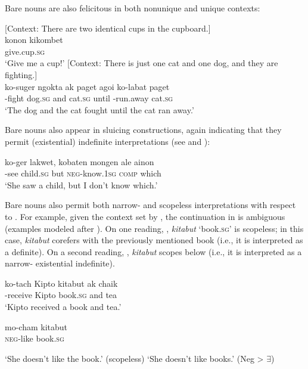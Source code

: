 \documentclass[output=paper]{LSP/langsci}
\begin{document}
\noindent Bare nouns are also felicitous in both nonunique and unique contexts:

\ea \label{ex:landman:uniqueness}
\settowidth{}  
  \ea \label{ex:landman:nonunique} [Context: There are two identical cups in the cupboard.]\\
    \gll konon kikombet \\
         give.\imp cup.\textsc{sg} \\ 
    \glt ‘Give me a cup!’
    \ex \label{ex:landman:unique} [Context: There is just one cat and one dog, and they are fighting.]\\ 
    \gll 
      ko-suger ngokta ak paget agoi ko-labat paget\\
      \pst-fight dog.\textsc{sg} and cat.\textsc{sg} until \pst-run.away cat.\textsc{sg}\\ 
    \glt ‘The dog and the cat fought until the cat ran away.’
  \z
\z 

Bare nouns also appear in sluicing constructions, again indicating that they permit (existential) indefinite interpretations (see \citealt{Chung:1995} and \citealt{Reinhart:1997}):

\ea \label{ex:landman:sluicing}
  \gll ko-ger lakwet, kobaten mongen ale ainon\\	
	   \pst-see child.\textsc{sg} but \textsc{neg}-know.1\textsc{sg} \textsc{comp} which\\
  \glt ‘She saw a child, but I don't know which.’
\z 

Bare nouns also permit both narrow- and scopeless interpretations with respect to . For example, given the context set by , the continuation in  is ambiguous (examples modeled after \citealt{Matthewson:2001}). On one reading, , \textit{kitabut} ‘book.\textsc{sg}’ is scopeless; in this case, \textit{kitabut} corefers with the previously mentioned book (i.e., it is interpreted as a definite). On a second reading, , \textit{kitabut} scopes below  (i.e., it is interpreted as a narrow- existential indefinite). 

\ea \label{ex:landman:context}
  \gll ko-tach Kipto kitabut ak chaik\\	
	   \pst-receive Kipto book.\textsc{sg} and tea\\
\glt ‘Kipto received a book and tea.’
\z 
   
\begin{exe}
\ex \label{ex:landman:barenounambig}
  \gll mo-cham kitabut\\	
       \textsc{neg}-like book.\textsc{sg}\\
  \begin{xlist}
  \ex \label{ex:landman:scopeless} ‘She doesn't like the book.’  (scopeless)
  \ex \label{ex:landman:negexis} ‘She doesn't like books.’ (Neg > $\exists$)
  \end{xlist}   
\end{exe}
\end{document}
